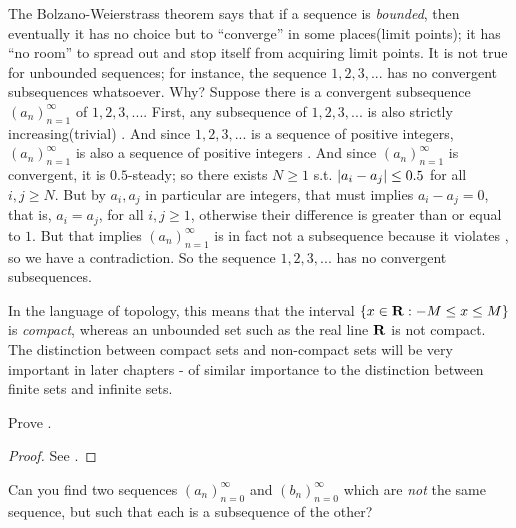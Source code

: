 \begin{remark} \label{remark 6.6.9}
The Bolzano-Weierstrass theorem says that if a sequence is \emph{bounded}, then eventually it has no choice but to ``converge'' in some places(limit points);
it has ``no room'' to spread out and stop itself from acquiring limit points.
It is not true for unbounded sequences; for instance, the sequence \(1, 2, 3,...\) has no convergent subsequences whatsoever.
Why? Suppose there is a convergent subsequence \((a_n)_{n = 1}^{\infty}\) of \(1, 2, 3,...\).
First, any subsequence of \(1, 2, 3,...\) is also strictly increasing(trivial) .
And since \(1, 2, 3,...\) is a sequence of positive integers, \((a_n)_{n = 1}^{\infty}\) is also a sequence of positive integers .
And since \((a_n)_{n = 1}^{\infty}\) is convergent, it is \(0.5\)-steady; so there exists \(N \ge 1\) s.t. \(\lvert a_i - a_j\rvert \le 0.5\) for all \(i, j \ge N\).
But by  \(a_i, a_j\) in particular are integers, that must implies \(a_i - a_j = 0\), that is, \(a_i = a_j\), for all \(i, j \ge 1\), otherwise their difference is greater than or equal to \(1\).
But that implies \((a_n)_{n = 1}^{\infty}\) is in fact not a subsequence because it violates , so we have a contradiction.
So the sequence \(1, 2, 3,...\) has no convergent subsequences.

In the language of topology, this means that the interval \(\{ x \in \mathbf{R} : -M \le x \le M \}\) is \emph{compact}, whereas an unbounded set such as the real line \(\mathbf{R}\) is not compact.
The distinction between compact sets and non-compact sets will be very important in later chapters - of similar importance to the distinction between finite sets and infinite sets.
\end{remark}

\exercisesection

\begin{exercise} \label{exercise 6.6.1}
Prove .
\end{exercise}

\begin{proof}
See .
\end{proof}

\begin{exercise} \label{exercise 6.6.2}
Can you find two sequences \((a_n)_{n = 0}^{\infty}\) and \((b_n)_{n = 0}^{\infty}\) which are \emph{not} the same sequence, but such that each is a subsequence of the other?
\end{exercise}

